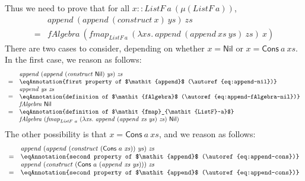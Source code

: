 \begin{proof*}
  Thus we need to prove that for all $x ::
  \mathit{ListF}~a~(\mu(\mathit{ListF}~a))$,
  \begin{displaymath}
    \begin{array}{cl}
      &\mathit{append}~(\mathit{append}~(\mathit{construct}~x)~\mathit{ys})~\mathit{zs}\\
      =&\mathit{fAlgebra}~(\mathit{fmap}_{\mathit{ListF}~a}~(\lambda \mathit{xs}.~\mathit{append}~(\mathit{append}~\mathit{xs}~\mathit{ys})~\mathit{zs})~x)
    \end{array}
  \end{displaymath}
  There are two cases to consider, depending on whether $x =
  \mathsf{Nil}$ or $x = \mathsf{Cons}~a~\mathit{xs}$. In the first
  case, we reason as follows:
  \begin{displaymath}
    \begin{array}{cl}
      & \mathit{append}~(\mathit{append}~(\mathit{construct}~\mathsf{Nil})~\mathit{ys})~\mathit{zs}\\
      =&\eqAnnotation{first property of $\mathit{append}$ (\autoref{eq:append-nil})} \\
      & \mathit{append}~\mathit{ys}~\mathit{zs} \\
      =&\eqAnnotation{definition of $\mathit{fAlgebra}$ (\autoref{eq:append-fAlgebra-nil})} \\
      & \mathit{fAlgebra}~\mathsf{Nil} \\
      =&\eqAnnotation{definition of $\mathit{fmap}_{\mathit{ListF}~a}$} \\
      & \mathit{fAlgebra}~(\mathit{fmap}_{\mathit{ListF}~a}~(\lambda \mathit{xs}.~\mathit{append}~(\mathit{append}~\mathit{xs}~\mathit{ys})~\mathit{zs})~\mathsf{Nil})
    \end{array}
  \end{displaymath}
  The other possibility is that $x = \mathsf{Cons}~a~\mathit{xs}$, and
  we reason as follows:
  \begin{displaymath}
    \begin{array}{cl}
      & \mathit{append}~(\mathit{append}~(\mathit{construct}~(\mathsf{Cons}~a~\mathit{xs}))~\mathit{ys})~\mathit{zs}\\
      =&\eqAnnotation{second property of $\mathit{append}$ (\autoref{eq:append-cons})} \\
      & \mathit{append}~(\mathit{construct}~(\mathsf{Cons}~a~(\mathit{append}~\mathit{xs}~\mathit{ys})))~\mathit{zs}\\
      =&\eqAnnotation{second property of $\mathit{append}$ (\autoref{eq:append-cons})} \\

\end{array}
\end{displaymath}
\end{proof*}
